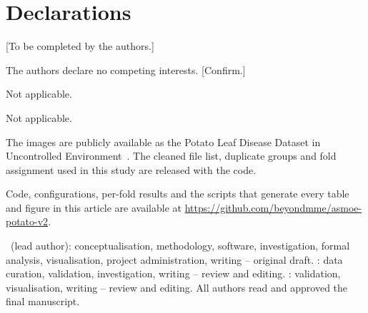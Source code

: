 \section*{Declarations}

 [To be completed by the authors.]

 The authors declare no competing interests. [Confirm.]

 Not applicable.

 Not applicable.

 The images are publicly available as the Potato Leaf Disease Dataset in
Uncontrolled Environment~\cite{shabrina2024dataset}. The cleaned file list, duplicate groups and
fold assignment used in this study are released with the code.

 Code, configurations, per-fold results and the scripts that generate
every table and figure in this article are available at
\url{https://github.com/beyondmme/asmoe-potato-v2}.

 \ (lead author): conceptualisation, methodology, software,
investigation, formal analysis, visualisation, project administration, writing -- original draft.
: data curation, validation, investigation, writing -- review and editing.
: validation, visualisation, writing -- review and editing.
All authors read and approved the final manuscript.
